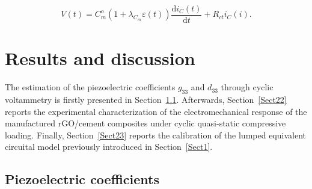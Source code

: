 \documentclass[a4paper,fleqn]{cas-sc}
\begin{document}
\begin{equation}
V(t) = C_m^o\left(1+\lambda_{C_m}\varepsilon(t)\right)\frac{\textrm{d}i_C(t)}{\textrm{d}t} + R_{ct}i_C(i).
\label{ouputvoltage}
\end{equation}


\section{Results and discussion}\label{Sect2}

The estimation of the piezoelectric coefficients $g_{33}$ and $d_{33}$ through cyclic voltammetry is firstly presented in Section~\ref{Sect21}. Afterwards, Section~\ref{Sect22} reports the experimental characterization of the electromechanical response of the manufactured rGO/cement composites under cyclic quasi-static compressive loading. Finally, Section~\ref{Sect23} reports the calibration of the lumped equivalent circuital model previously introduced in Section~\ref{Sect1}.

\subsection{Piezoelectric coefficients}\label{Sect21}
\end{document}
